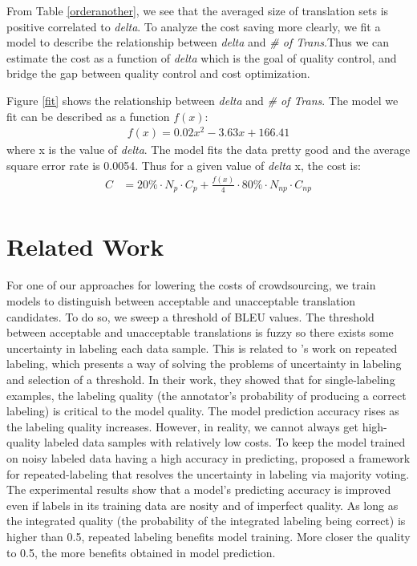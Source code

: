 \documentclass[11pt]{article}
\begin{document}
From Table \ref{orderanother}, we see that the averaged size of translation sets is positive correlated to \textit{delta}. To analyze the cost saving more clearly, we fit a model to describe the relationship between \textit{delta} and \textit{\# of Trans}.Thus we can estimate the cost as a function of \textit{delta} which is the goal of  quality control, and bridge the gap between quality control and cost optimization.

Figure \ref{fit} shows the relationship between \textit{delta} and \textit{\# of Trans}. The model we fit can be described as a function $f(x)$:
\begin{align*}
f(x) = 0.02x^2 - 3.63x+166.41
\end{align*}
 where x is the value of \textit{delta}. The model fits the data pretty good and the average square error rate is 
0.0054. Thus for a given value of \textit{delta} x, the cost is:
\begin{align*}
C& = 20\% \cdot N_{p}\cdot C_{p}  +  \frac{f(x)}{4}\cdot 80\% \cdot N_{np} \cdot C_{np}\\
\end{align*} 

\section{Related Work}

For one of our approaches for lowering the costs of crowdsourcing,  we train models to distinguish between acceptable and unacceptable translation candidates.  To do so,
we sweep a threshold of BLEU values. The threshold between acceptable and unacceptable translations is fuzzy so there exists some uncertainty in labeling each data sample.  This is related to \cite{sheng2008get}'s work on repeated labeling, which presents a way of solving the problems of   uncertainty in labeling and selection of a threshold. In their work, they showed that for single-labeling examples, the labeling quality (the annotator's probability of producing a correct labeling) is critical to the model quality. The model prediction accuracy rises as the labeling quality increases. However, in reality, we cannot always get high-quality labeled data samples with relatively low costs. To keep the model trained on noisy labeled data having a high accuracy in predicting,  proposed a framework for repeated-labeling that resolves the uncertainty in labeling via majority voting.  
The experimental results show that a model's predicting accuracy is improved even if labels in its training data are nosity and of imperfect quality.  As long as the integrated quality (the probability of the integrated labeling being correct) is higher than 0.5, repeated labeling benefits model training. More closer the quality to 0.5, the more benefits obtained in model prediction.
\end{document}
